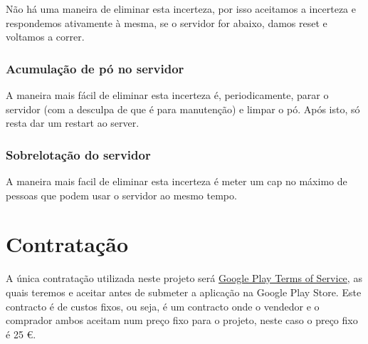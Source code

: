 \documentclass[a4paper]{article}
\begin{document}
Não há uma maneira de eliminar esta incerteza, por isso aceitamos a incerteza e respondemos ativamente à mesma, se o servidor for abaixo, damos reset e voltamos a correr.

\subsubsection{Acumulação de pó no servidor}

A maneira mais fácil de eliminar esta incerteza é, periodicamente, parar o servidor (com a desculpa de que é para manutenção) e limpar o pó. Após isto, só resta dar um restart ao server.

\subsubsection{Sobrelotação do servidor}

A maneira mais facil de eliminar esta incerteza é meter um cap no máximo de pessoas que podem usar o servidor ao mesmo tempo.


\section{Contratação}

A única contratação utilizada neste projeto será \href{https://play.google.com/intl/en-us_us/about/play-terms.html}{Google Play Terms of Service}, as quais teremos e aceitar antes de submeter a aplicação na Google Play Store. Este contracto é de custos fixos, ou seja, é um contracto onde o vendedor e o comprador ambos aceitam num preço fixo para o projeto, neste caso o preço fixo é 25 \euro.
\end{document}
